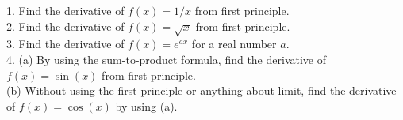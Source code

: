 1. Find the derivative of $f(x)=1/x$ from first principle.\\
2. Find the derivative of $f(x)=\sqrt x$ from first principle.\\
3. Find the derivative of $f(x)=e^{ax}$ for a real number $a$.\\
4. (a) By using the sum-to-product formula, find the derivative of $f(x)=\sin(x)$ from first principle.\\
(b) Without using the first principle or anything about limit, find the derivative of $f(x)=\cos(x)$ by using (a).